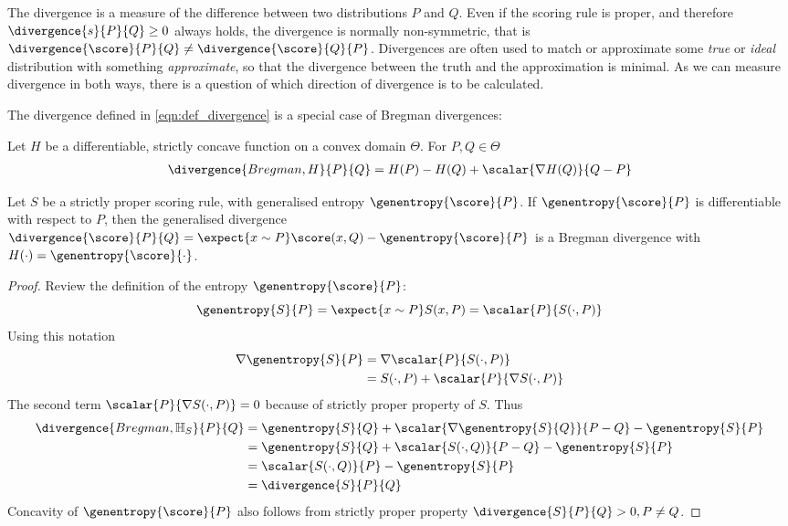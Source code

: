 The divergence is a measure of the difference between two distributions $P$ and $Q$. Even if the scoring rule is proper, and therefore $\divergence{s}{P}{Q} \geq 0$ always holds, the divergence is normally non-symmetric, that is $\divergence{\score}{P}{Q} \neq \divergence{\score}{Q}{P}$. Divergences are often used to match or approximate some \emph{true} or \emph{ideal} distribution with something \emph{approximate}, so that the divergence between the truth and the approximation is minimal. As we can measure divergence in both ways, there is a question of which direction of divergence is to be calculated.

The divergence defined in \eqref{eqn:def_divergence} is a special case of Bregman divergences:

\begin{definition}
	Let $H$ be a differentiable, strictly concave function on a convex domain $\Theta$. For $P,Q\in\Theta$ 
	\begin{align}
		\divergence{Bregman,H}{P}{Q} = H(P) - H(Q) + \scalar{\nabla H(Q)}{Q-P}
	\end{align}
\end{definition}


\begin{statement}
	Let $S$ be a strictly proper scoring rule, with generalised entropy $\genentropy{\score}{P}$. If $\genentropy{\score}{P}$ is differentiable with respect to $P$, then the generalised divergence $\divergence{\score}{P}{Q} = \expect{x\sim P}\score(x,Q) - \genentropy{\score}{P}$ is a Bregman divergence with $H(\cdot) = \genentropy{\score}{\cdot}$.
\begin{proof}
	Review the definition of the entropy $\genentropy{\score}{P}$:
		\begin{equation}
			\genentropy{S}{P} = \expect{x \sim P}S(x,P) = \scalar{P}{S(\cdot,P)}
		\end{equation}
		Using this notation
		\begin{align}
			\nabla\genentropy{S}{P} &=  \nabla\scalar{P}{S(\cdot,P)}\\
				&= S(\cdot,P) + \scalar{P}{\nabla S(\cdot,P)}
		\end{align}
	The second term $\scalar{P}{\nabla S(\cdot,P)}=0$ because of strictly proper property of $S$. Thus
 		\begin{align}
 		 	\divergence{Bregman,\mathbb{H}_{S}}{P}{Q}&= \genentropy{S}{Q}  + \scalar{\nabla \genentropy{S}{Q}}{P-Q} -  \genentropy{S}{P} \\
 		 		&= \genentropy{S}{Q} + \scalar{S(\cdot,Q)}{P - Q} -  \genentropy{S}{P}\\
 		 		&= \scalar{S(\cdot,Q)}{P} - \genentropy{S}{P}\\
 		 		&= \divergence{S}{P}{Q}
 		\end{align}
 		Concavity of $\genentropy{\score}{P}$ also follows from strictly proper property $\divergence{S}{P}{Q}>0,P\neq Q$.
\end{proof}
\end{statement}

